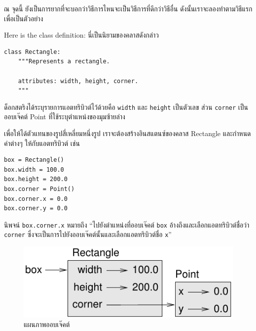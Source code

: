 
ณ จุดนี้ ยังเป็นการยากที่จะบอกว่าวิธีการไหนจะเป็นวิธีการที่ดีกว่าวิธีอื่น ดังนั้นเราจะลองทำตามวิธีแรกเพื่อเป็นตัวอย่าง


Here is the class definition:
นี่เป็นนิยามของคลาสดังกล่าว

\begin{verbatim}
class Rectangle:
    """Represents a rectangle. 

    attributes: width, height, corner.
    """
\end{verbatim}
%

ด็อกสตริงได้ระบุรายการแอตทริบิวต์ไว้ด้วยคือ {\tt width} และ {\tt height} เป็นตัวเลข 
ส่วน {\tt corner} เป็นออบเจ๊คต์ Point ที่ใช้ระบุตำแหน่งของมุมซ้ายล่าง

เพื่อให้ได้ตัวแทนของรูปสี่เหลี่ยมหนึ่งรูป เราจะต้องสร้างอินสแตนซ์ของคลาส Rectangle และกำหนดค่าต่างๆ ให้กับแอตทริบิวต์ เช่น

\begin{verbatim}
box = Rectangle()
box.width = 100.0
box.height = 200.0
box.corner = Point()
box.corner.x = 0.0
box.corner.y = 0.0
\end{verbatim}
%

นิพจน์ {\tt box.corner.x} หมายถึง
``ไปยังตำแหน่งที่ออบเจ๊คต์ {\tt box} อ้างถึงและเลือกแอตทริบิวต์ชื่อว่า {\tt corner} ซึ่งจะเป็นการไปยังออบเจ๊คต์นั้นและเลือกแอตทริบิวต์ชื่อ {\tt x}''

\begin{figure}
\centerline
{\includegraphics[scale=0.8]{figs/rectangle.pdf}}
\caption{แผนภาพออบเจ๊คต์}
\label{fig.rectangle}
\end{figure}


